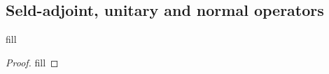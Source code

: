 \subsection{Seld-adjoint, unitary and normal operators}

\begin{exercise}{1}
fill
\end{exercise}
\begin{proof}
fill
\end{proof}